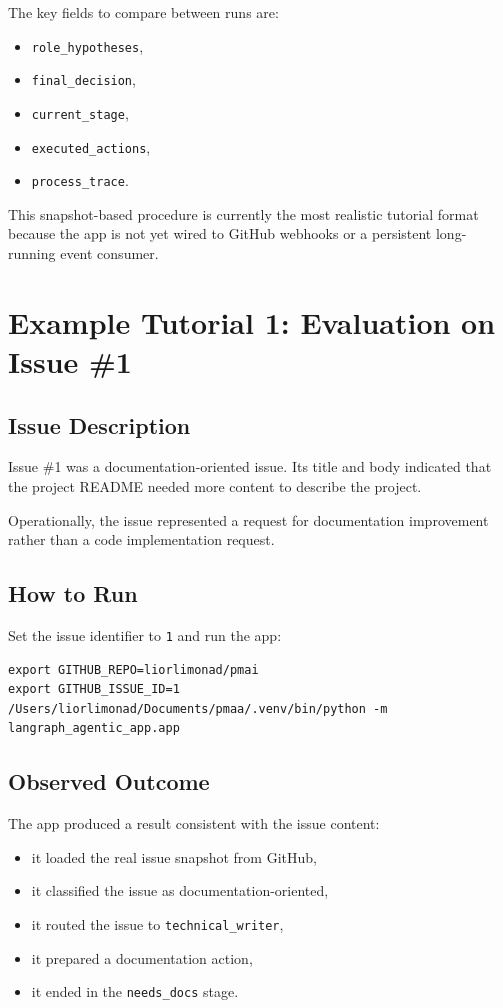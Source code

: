 \documentclass[11pt,a4paper]{article}
\begin{document}
The key fields to compare between runs are:
\begin{itemize}
    \item \texttt{role\_hypotheses},
    \item \texttt{final\_decision},
    \item \texttt{current\_stage},
    \item \texttt{executed\_actions},
    \item \texttt{process\_trace}.
\end{itemize}

This snapshot-based procedure is currently the most realistic tutorial format because the app is not yet wired to GitHub webhooks or a persistent long-running event consumer.

\section{Example Tutorial 1: Evaluation on Issue \#1}

\subsection{Issue Description}

Issue \#1 was a documentation-oriented issue. Its title and body indicated that the project README needed more content to describe the project.

Operationally, the issue represented a request for documentation improvement rather than a code implementation request.

\subsection{How to Run}

Set the issue identifier to \texttt{1} and run the app:

\begin{lstlisting}[style=bashstyle]
export GITHUB_REPO=liorlimonad/pmai
export GITHUB_ISSUE_ID=1
/Users/liorlimonad/Documents/pmaa/.venv/bin/python -m langraph_agentic_app.app
\end{lstlisting}

\subsection{Observed Outcome}

The app produced a result consistent with the issue content:
\begin{itemize}
    \item it loaded the real issue snapshot from GitHub,
    \item it classified the issue as documentation-oriented,
    \item it routed the issue to \texttt{technical\_writer},
    \item it prepared a documentation action,
    \item it ended in the \texttt{needs\_docs} stage.
\end{itemize}
\end{document}
